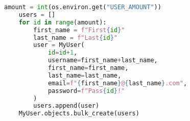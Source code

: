 \begin{lstlisting}[language=Python,caption={Populating django DB},breaklines=true,label={lst:djangoSeedDb}]
    amount = int(os.environ.get("USER_AMOUNT"))
    users = []
    for id in range(amount):
        first_name = f"First{id}"
        last_name = f"Last{id}"
        user = MyUser(
            id=id+1,
            username=first_name+last_name,
            first_name=first_name,
            last_name=last_name,
            email=f"{first_name}@{last_name}.com",
            password=f"Pass{id}!"
        )
        users.append(user)
    MyUser.objects.bulk_create(users)
\end{lstlisting}
